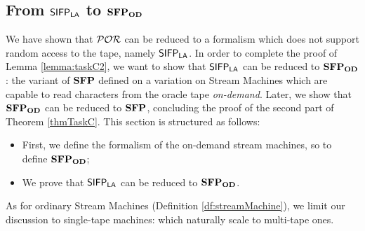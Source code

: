 %



































\subsection{From $\mathsf{SIFP_{{\mathsf{LA}}}}$ to $\mathbf{SFP_{\mathbf{OD}}}$}
\label{sub:sifplatosfpod}

We have shown that $\mathcal{POR}$ can be reduced to a formalism which does
not support random access to the tape, namely $\mathsf{SIFP_{{\mathsf{LA}}}}$. In order to complete
the proof of Lemma \ref{lemma:taskC2}, we want to show that $\mathsf{SIFP_{{\mathsf{LA}}}}$ can be reduced to
$\mathbf{SFP_{\mathbf{OD}}}$: the variant of $\mathbf{SFP}$ defined on a variation on Stream Machines
which are capable to read characters from the oracle tape
\emph{on-demand}. Later, we show that $\mathbf{SFP_{\mathbf{OD}}}$ can
be reduced to $\mathbf{SFP}$, concluding the proof of the second part of Theorem
\ref{thmTaskC}.
%
This section is structured as follows:
\begin{itemize}
  \item First, we define the formalism of the
  on-demand stream machines, so to define $\mathbf{SFP_{\mathbf{OD}}}$;
  \item We prove that
  $\mathsf{SIFP_{{\mathsf{LA}}}}$ can be reduced to $\mathbf{SFP_{\mathbf{OD}}}$.
\end{itemize}
%
As for ordinary Stream Machines (Definition \ref{df:streamMachine}), we limit
our discussion to single-tape machines: which naturally scale to multi-tape
ones.


